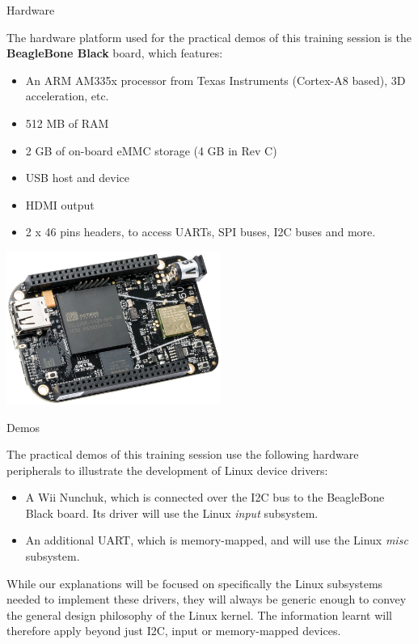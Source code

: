 \documentclass[a4paper,12pt,obeyspaces,spaces,hyphens]{article}
\begin{document}
\feagendatwocolumn
{Hardware}
{
  The hardware platform used for the practical demos of this training
  session is the {\bf BeagleBone Black} board, which features:

  \begin{itemize}
  \item An ARM AM335x processor from Texas Instruments (Cortex-A8
    based), 3D acceleration, etc.
  \item 512 MB of RAM
  \item 2 GB of on-board eMMC storage
        \newline(4 GB in Rev C)
  \item USB host and device
  \item HDMI output
  \item 2 x 46 pins headers, to access UARTs, SPI buses, I2C buses
    and more.
  \end{itemize}
}
{}
{
  \begin{center}
    \includegraphics[height=5cm]{../slides/beagleboneblack-board/beagleboneblack.png}
  \end{center}
}

\feagendaonecolumn
{Demos}
{
  The practical demos of this training session use the following
  hardware peripherals to illustrate the development of Linux device
  drivers:

  \begin{itemize}
  \item A Wii Nunchuk, which is connected over the I2C bus to the
    BeagleBone Black board. Its driver will use the Linux {\em input}
    subsystem.
  \item An additional UART, which is memory-mapped, and will use the
    Linux {\em misc} subsystem.
  \end{itemize}

  While our explanations will be focused on specifically the Linux
  subsystems needed to implement these drivers, they will always be
  generic enough to convey the general design philosophy of the Linux
  kernel. The information learnt will therefore apply beyond just
  I2C, input or memory-mapped devices.
}
\end{document}

